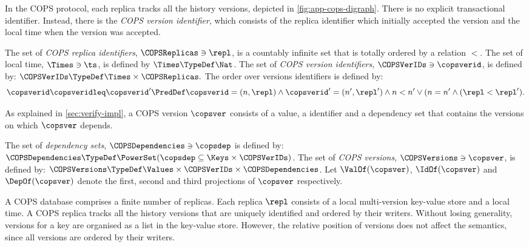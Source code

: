 In the COPS protocol, 
each replica tracks all the history versions, depicted in \cref{fig:app-cops-digraph}.
There is no explicit transactional identifier.
Instead, there is the \emph{COPS version identifier},
which consists of the replica identifier which initially accepted the version 
and the local time when the version was accepted.



\begin{definition}
\label{fig:cops-ver-id}
The set of \emph{COPS replica identifiers}, \( \COPSReplicas \ni \repl \), 
is a countably infinite set that is totally ordered by a relation \( < \).
The set of local time, \( \Times \ni \ts\), is defined by \( \Times \TypeDef \Nat \).
The set of \emph{COPS version identifiers}, \( \COPSVerIDs \ni \copsverid \),
is defined by: \( \COPSVerIDs \TypeDef \Times \times \COPSReplicas .  \)
The order over versions identifiers is defined by:
\[ 
\copsverid \copsveridleq \copsverid'
\PredDef 
\copsverid = (n,\repl)
\land \copsverid' = (n',\repl')
\land n < n' \lor ( n = n' \land ( \repl < \repl' ) .
\]
\end{definition}

As explained in \cref{sec:verify-impl},
a COPS version \( \copsver \) consists of a value, a identifier 
and a dependency set that contains the versions on which \( \copsver \) depends.

\begin{definition}
The set of \emph{dependency sets}, \( \COPSDependencies \ni \copsdep \) 
is defined by: \( \COPSDependencies \TypeDef \PowerSet(\copsdep \subseteq \Keys \times \COPSVerIDs) \).
The set of \emph{COPS versions}, \( \COPSVersions \ni \copsver \), is defined by: 
\( \COPSVersions \TypeDef \Values \times \COPSVerIDs  \times \COPSDependencies \).
Let \(\ValOf(\copsver)\), \(\IdOf(\copsver)\)  
and \( \DepOf(\copsver)\) denote the first, second and third projections of \( \copsver \) respectively.
\end{definition}

A COPS database comprises a finite number of replicas.
Each replica \( \repl \) consists of a local multi-version key-value store and a local time.
A COPS replica tracks all the history versions that are uniquely identified and ordered by their writers.
Without losing generality, versions for a key are organised as a list in the key-value store.
However, the relative position of versions does not affect the semantics, since all versions are ordered by their writers.

